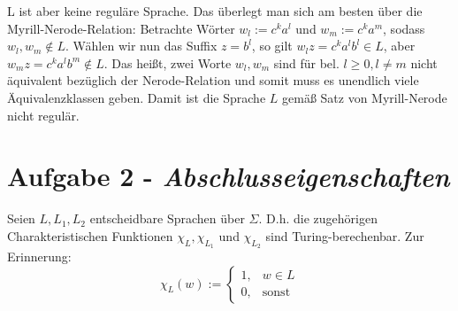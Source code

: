 \documentclass{article}
\begin{document}
L ist aber keine reguläre Sprache. Das überlegt man sich am besten über die Myrill-Nerode-Relation: Betrachte Wörter $w_l := c^k a^l$ und $w_m := c^k a^m$, sodass $w_l,w_m \not\in L$. Wählen wir nun das Suffix $z = b^l$, so gilt $w_lz = c^k a^l b^l \in L$, aber $w_mz = c^k a^l b^m \not\in L$. Das heißt, zwei Worte $w_l, w_m$ sind für bel. $l \ge 0, l \neq m$ nicht äquivalent bezüglich der Nerode-Relation und somit muss es unendlich viele Äquivalenzklassen geben. Damit ist die Sprache $L$ gemäß Satz von Myrill-Nerode nicht regulär.

\section*{Aufgabe 2 - \textit{Abschlusseigenschaften}}

Seien $L, L_1, L_2$ entscheidbare Sprachen über $\Sigma$. D.h. die zugehörigen Charakteristischen Funktionen $\chi_L, \chi_{L_1}$ und $\chi_{L_2}$ sind Turing-berechenbar. Zur Erinnerung:
\begin{equation}
	\chi_L(w) := \begin{cases}
	1, &w \in L\\
	0, &\text{sonst}
	\end{cases}
\end{equation}
\end{document}
